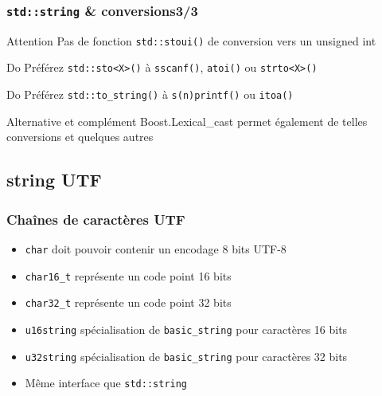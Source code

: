 \documentclass[C++.tex]{subfiles}
\begin{document}
\begin{frame}[fragile]
	\frametitle{\lstinline|std::string| \& conversions\titlehfill{}3/3}
	\begin{alertblock}{Attention}
		Pas de fonction \lstinline|std::stoui()| de conversion vers un unsigned int
	\end{alertblock}

	\begin{exampleblock}{Do}
		Préférez \lstinline|std::sto<X>()| à \lstinline|sscanf()|, \lstinline|atoi()| ou \lstinline|strto<X>()|
	\end{exampleblock}

	\begin{exampleblock}{Do}
		Préférez \lstinline|std::to_string()| à \lstinline|s(n)printf()| ou \lstinline|itoa()|
	\end{exampleblock}

	\begin{block}{Alternative et complément}
		Boost.Lexical\_cast permet également de telles conversions et quelques autres
	\end{block}
\end{frame}

\subsection*{string UTF}
\begin{frame}[fragile]
	\frametitle{Chaînes de caractères UTF}
	\begin{itemize}
		\item \lstinline|char| doit pouvoir contenir un encodage 8 bits UTF-8


		\item \lstinline|char16_t| représente un code point 16 bits
		\item \lstinline|char32_t| représente un code point 32 bits
		\item \lstinline|u16string| spécialisation de \lstinline|basic_string| pour caractères 16 bits
		\item \lstinline|u32string| spécialisation de \lstinline|basic_string| pour caractères 32 bits
		\item Même interface que \lstinline|std::string|
	\end{itemize}
\end{frame}
\end{document}

